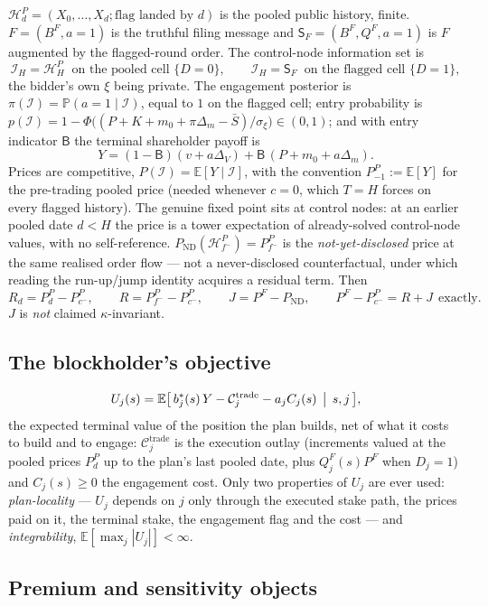 \documentclass[11pt,a4paper]{article}
\newcommand{\Eop}{\mathbb{E}}
\newcommand{\Prb}{\mathbb{P}}
\newcommand{\ND}{\mathrm{ND}}
\newcommand{\Sfl}{\mathsf{S}_F}
\begin{document}
$\mathcal H_d^P=(X_0,\dots,X_d;\text{flag landed by }d)$ is the pooled public
history, finite. $F=(B^F,a=1)$ is the truthful filing message and
$\Sfl=(B^F,Q^F,a{=}1)$ is $F$ augmented by the flagged-round order. The
control-node information set is
\[
\mathcal I_H=\mathcal H_H^P\ \text{ on the pooled cell }\{D=0\},
\qquad
\mathcal I_H=\Sfl\ \text{ on the flagged cell }\{D=1\},
\]
the bidder's own $\xi$ being private. The engagement posterior is
$\pi(\mathcal I)=\Prb(a=1\mid\mathcal I)$, equal to $1$ on the flagged cell; entry
probability is
$p(\mathcal I)=1-\Phi\bigl((P+K+m_0+\pi\Delta_m-\bar S)/\sigma_\xi\bigr)\in(0,1)$;
and with entry indicator $\mathsf B$ the terminal shareholder payoff is
\[
Y=(1-\mathsf B)(v+a\Delta_V)+\mathsf B\,(P+m_0+a\Delta_m).
\]
Prices are competitive, $P(\mathcal I)=\Eop[Y\mid\mathcal I]$, with the convention
$P_{-1}^P:=\Eop[Y]$ for the pre-trading pooled price (needed whenever $c=0$, which
$T=H$ forces on every flagged history). The genuine fixed point sits at control
nodes: at an earlier pooled date $d<H$ the price is a tower expectation of
already-solved control-node values, with no self-reference.
$P_{\ND}(\mathcal H_{f^-}^P)=P_{f^-}^P$ is the \emph{not-yet-disclosed} price at the
same realised order flow --- not a never-disclosed counterfactual, under which
reading the run-up/jump identity acquires a residual term. Then
\[
R_d=P_d^P-P_{c^-}^P,\qquad R=P_{f^-}^P-P_{c^-}^P,\qquad J=P^F-P_{\ND},
\qquad P^F-P_{c^-}^P=R+J\ \ \text{exactly}.
\]
$J$ is \emph{not} claimed $\kappa$-invariant.

\subsection*{The blockholder's objective}

\[
U_j(s)=\Eop\bigl[\,b_j^*(s)\,Y-\mathcal C_j^{\mathrm{trade}}-a_jC_j(s)\,\bigm|\,s,j\,\bigr],
\]
the expected terminal value of the position the plan builds, net of what it costs to
build and to engage: $\mathcal C_j^{\mathrm{trade}}$ is the execution outlay
(increments valued at the pooled prices $P_d^P$ up to the plan's last pooled date,
plus $Q_j^F(s)P^F$ when $D_j=1$) and $C_j(s)\ge0$ the engagement cost. Only two
properties of $U_j$ are ever used: \emph{plan-locality} --- $U_j$ depends on $j$
only through the executed stake path, the prices paid on it, the terminal stake, the
engagement flag and the cost --- and \emph{integrability},
$\Eop[\max_j|U_j|]<\infty$.

\subsection*{Premium and sensitivity objects}
\end{document}
